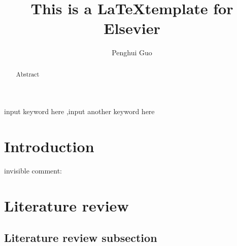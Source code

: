 \documentclass[3p, review]{elsarticle}
\newcommand\todo[1]{{\textcolor{orange}{\sc TODO: (#1)}}}
\renewcommand\todo[1]{}
\newcommand\cmt[1]{{\textcolor{NavyBlue}{[#1]}}}
\renewcommand\cmt[1]{}
\newcommand\highlight[1]{{\color{orange}{#1}}}
\renewcommand\highlight[1]{{\color{black}{#1}}}
\begin{document}
\hypersetup{allcolors=NavyBlue}  

\begin{frontmatter}

\title{This is a \LaTeX template for Elsevier}


\author[nuaa]{Penghui Guo
}

\address[nuaa]{College of Economics and Management, Nanjing University of Aeronautics and Astronautics, Nanjing 211106, China}


\begin{abstract}
        Abstract
\end{abstract}

\begin{keyword}
        input keyword here
        \sep input another keyword here
\end{keyword}

\end{frontmatter}


\newpage

\section{Introduction} \label{SEC: Introduction}

\todo{Something to do}

\highlight{Something be highlighted}

\cmt{Some comment}

invisible comment:

\section{Literature review} \label{SEC: Related works}
 
\subsection{Literature review subsection} \label{SUBSEC: Literature review subsection}
\end{document}
